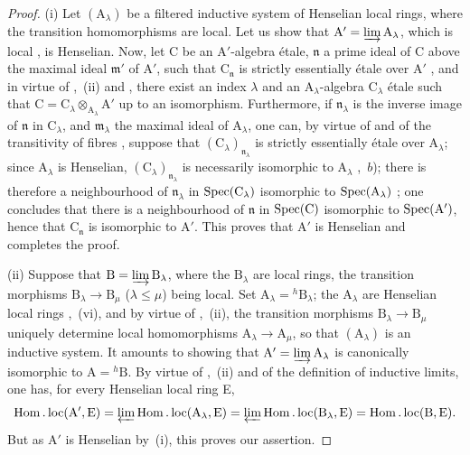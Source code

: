 \begin{proof}
(i) Let $(\mathrm{A}_\lambda)$ be a filtered inductive system of Henselian local rings, where the transition homomorphisms are local.
Let us show that $\mathrm{A}'=\varinjlim\mathrm{A}_\lambda$, which is local , is Henselian.
Now, let C be an $\mathrm{A}'$-algebra \'{e}tale, $\mathfrak{n}$ a prime ideal
of C above the maximal ideal $\mathfrak{m}'$ of $\mathrm{A}'$, such that $\mathrm{C}_{\mathfrak{n}}$ is strictly essentially \'{e}tale over $\mathrm{A}'$ , and in virtue of ,~(ii) and , there exist an index $\lambda$ and an $\mathrm{A}_\lambda$-algebra $\mathrm{C}_\lambda$ \'{e}tale such that $\mathrm{C}=\mathrm{C}_\lambda\otimes_{\mathrm{A}_\lambda}\mathrm{A}'$ up to an isomorphism.
Furthermore, if $\mathfrak{n}_\lambda$ is the inverse image of $\mathfrak{n}$ in $\mathrm{C}_\lambda$, and $\mathfrak{m}_\lambda$ the maximal ideal of $\mathrm{A}_\lambda$, one can, by virtue of  and of the transitivity of fibres , suppose that $(\mathrm{C}_\lambda)_{\mathfrak{n}_\lambda}$ is strictly essentially \'{e}tale over $\mathrm{A}_\lambda$;
since $\mathrm{A}_\lambda$ is Henselian, $(\mathrm{C}_\lambda)_{\mathfrak{n}_\lambda}$ is necessarily isomorphic to $\mathrm{A}_\lambda$ ,~$b$);
there is therefore a neighbourhood of $\mathfrak{n}_\lambda$ in $\operatorname{Spec}(\mathrm{C}_\lambda)$ isomorphic to $\operatorname{Spec}(\mathrm{A}_\lambda)$ ;
one concludes that there is a neighbourhood of $\mathfrak{n}$ in $\operatorname{Spec}(\mathrm{C})$ isomorphic to $\operatorname{Spec}(\mathrm{A}')$, hence that $\mathrm{C}_\mathfrak{n}$ is isomorphic to $\mathrm{A}'$.  This proves that $\mathrm{A}'$ is Henselian  and completes the proof.

(ii) Suppose that $\mathrm{B}=\varinjlim\mathrm{B}_\lambda$, where the $\mathrm{B}_\lambda$ are local rings, the transition morphisms $\mathrm{B}_\lambda\to\mathrm{B}_\mu$ ($\lambda\leq\mu$) being local.
Set $\mathrm{A}_\lambda={}^h\!\mathrm{B}_\lambda$;
the $\mathrm{A}_\lambda$ are Henselian local rings ,~(vi), and by virtue of ,~(ii), the transition morphisms $\mathrm{B}_\lambda\to\mathrm{B}_\mu$ uniquely determine local homomorphisms $\mathrm{A}_\lambda\to\mathrm{A}_\mu$, so that $(\mathrm{A}_\lambda)$ is an inductive system.
It amounts to showing that $\mathrm{A}'=\varinjlim\mathrm{A}_\lambda$ is canonically isomorphic to $\mathrm{A}={}^h\!\mathrm{B}$.
By virtue of ,~(ii) and of the definition of inductive limits, one has, for every Henselian local ring E,
\[
  \operatorname{Hom}.\operatorname{loc}(\mathrm{A}',\mathrm{E})=\varprojlim\operatorname{Hom}.\operatorname{loc}(\mathrm{A}_\lambda,\mathrm{E})=\varprojlim\operatorname{Hom}.\operatorname{loc}(\mathrm{B}_\lambda,\mathrm{E})=\operatorname{Hom}.\operatorname{loc}(\mathrm{B},\mathrm{E}).
\]
But as $\mathrm{A}'$ is Henselian by~(i), this proves our assertion.


\end{proof}
